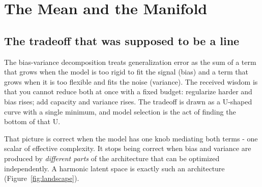 \section{The Mean and the Manifold}
\label{sec:manifold}

\subsection{The tradeoff that was supposed to be a line}

The bias-variance decomposition treats generalization error as the sum of a term that grows when the model is too rigid to fit the signal (bias) and a term that grows when it is too flexible and fits the noise (variance). The received wisdom is that you cannot reduce both at once with a fixed budget: regularize harder and bias rises; add capacity and variance rises. The tradeoff is drawn as a U-shaped curve with a single minimum, and model selection is the act of finding the bottom of that U.

That picture is correct when the model has one knob mediating both terms - one scalar of effective complexity. It stops being correct when bias and variance are produced by \textit{different parts} of the architecture that can be optimized independently. A harmonic latent space is exactly such an architecture (Figure~\ref{fig:landscape}).

